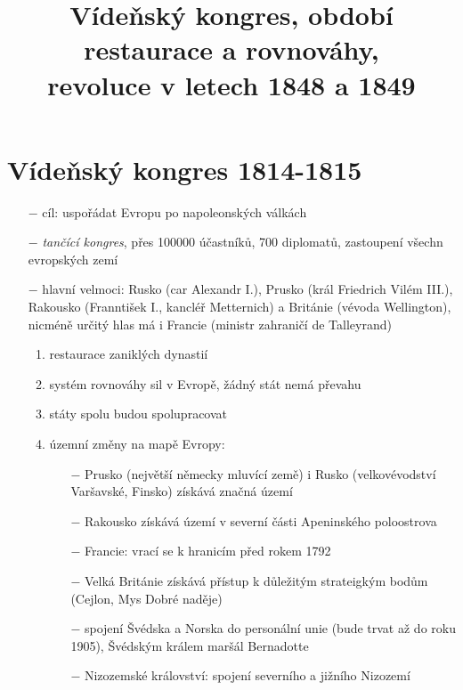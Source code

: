 \documentclass{article}
\title{\vspace{-2cm}Vídeňský kongres, období restaurace a rovnováhy,\\ revoluce v letech 1848 a 1849\vspace{-1.7cm}}
\date{}
\author{}
\begin{document}
\maketitle


\section*{Vídeňský kongres 1814-1815}
\begin{itemize}
    \vspace{-0.5em}
    \setlength\itemsep{0.15em}
    \item[$-$] cíl: uspořádat Evropu po napoleonských válkách
    \item[$-$] \textit{tančící kongres}, přes 100000 účastníků, 700 diplomatů, zastoupení všechn evropských zemí
    \item[$-$] hlavní velmoci: Rusko (car Alexandr I.), Prusko (král Friedrich Vilém III.), Rakousko (Franntišek I., kancléř Metternich) a Británie (vévoda Wellington), nicméně určitý hlas má i Francie (ministr zahraničí de Talleyrand)
    \begin{enumerate}
        \vspace{-0.5em}
        \setlength\itemsep{0.15em}
        \item restaurace zaniklých dynastií
        \item systém rovnováhy sil v Evropě, žádný stát nemá převahu
        \item státy spolu budou spolupracovat
        \item územní změny na mapě Evropy:
        \begin{itemize}
            \vspace{-0.5em}
            \setlength\itemsep{0.15em}
            \item[$-$] Prusko (největší německy mluvící země) i Rusko (velkovévodství Varšavské, Finsko) získává značná území
            \item[$-$] Rakousko získává území v severní části Apeninského poloostrova
            \item[$-$] Francie: vrací se k hranicím před rokem 1792
            \item[$-$] Velká Británie získává přístup k důležitým strateigkým bodům (Cejlon, Mys Dobré naděje)
            \item[$-$] spojení Švédska a Norska do personální unie (bude trvat až do roku 1905), Švédským králem maršál Bernadotte
            \item[$-$] Nizozemské království: spojení severního a jižního Nizozemí

\end{itemize}
\end{enumerate}
\end{itemize}
\end{document}
